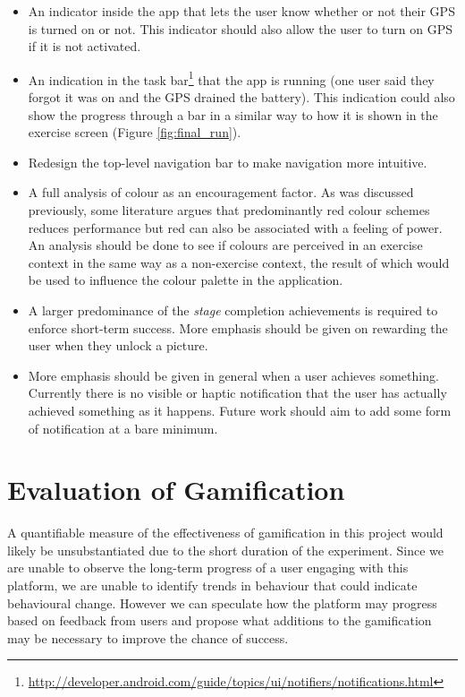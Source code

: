 \begin{itemize}
  \item An indicator inside the app that lets the user know whether or
    not their GPS is turned on or not. This indicator should also
    allow the user to turn on GPS if it is not activated.
  \item An indication in the task
    bar\footnote{\url{http://developer.android.com/guide/topics/ui/notifiers/notifications.html}}
    that the app is running (one user said they forgot it was on and
    the GPS drained the battery). This indication could also show the
    progress through a bar in a similar way to how it is shown in the
    exercise screen (Figure \ref{fig:final_run}).
  \item Redesign the top-level navigation bar to make navigation more
    intuitive. 
  \item A full analysis of colour as an encouragement factor. As was
    discussed previously, some literature argues that predominantly
    red colour schemes reduces performance\cite{colours_red} but red
    can also be associated with a feeling of power. An analysis should
    be done to see if colours are perceived in an exercise context in
    the same way as a non-exercise context, the result of which would
    be used to influence the colour palette in the application.
  \item A larger predominance of the \emph{stage} completion
    achievements is required to enforce short-term success. More
    emphasis should be given on rewarding the user  when they unlock a
    picture. 
  \item More emphasis should be given in general when a user achieves
    something. Currently there is no visible or haptic notification
    that the user has actually achieved something as it
    happens. Future work should aim to add some form of notification
    at a bare minimum.
\end{itemize}

\section{Evaluation of Gamification}
A quantifiable measure of the effectiveness of gamification in this
project would likely be unsubstantiated due to the short duration of 
the experiment. Since we are unable to observe the long-term progress
of a user engaging with this platform, we are unable to identify
trends in behaviour that could indicate behavioural change. However we
can speculate how the platform may progress based on feedback from
users and propose what additions to the gamification may be necessary
to improve the chance of success.

